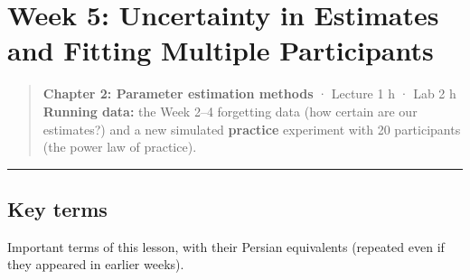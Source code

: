 \section{Week 5: Uncertainty in Estimates and Fitting Multiple
Participants}

\begin{quote}
\textbf{Chapter 2: Parameter estimation methods} · Lecture 1 h · Lab 2 h
\textbf{Running data:} the Week 2--4 forgetting data (how certain are
our estimates?) and a new simulated \textbf{practice} experiment with 20
participants (the power law of practice).
\end{quote}

\begin{center}\rule{0.5\linewidth}{0.5pt}\end{center}

\subsection{Key terms}

Important terms of this lesson, with their Persian equivalents (repeated
even if they appeared in earlier weeks).

